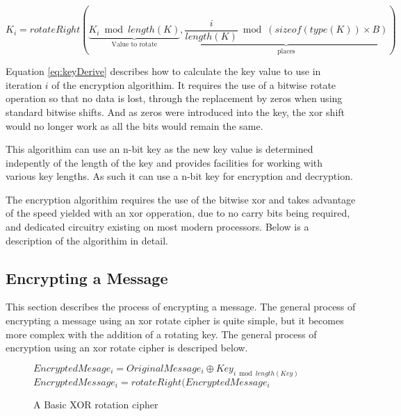 \documentclass[12pt]{article}
\begin{document}
  \begin{equation}
    \label{eq:keyDerive}
    K_i = rotateRight(
        \underbrace{K_i \bmod length(K)}_\text{Value to rotate},
        \underbrace{\frac{i}{length(K)} \bmod (sizeof(type(K)) 
            \times B)}_\text{places}) 
  \end{equation}

  Equation \eqref{eq:keyDerive} describes how to calculate the key value to use
  in iteration \( i \) of the encryption algorithim. It requires the use
  of a bitwise rotate operation so that no data is lost, through the
  replacement by zeros when using standard bitwise shifts. And as zeros
  were introduced into the key, the xor shift would no longer work as
  all the bits would remain the same.

  This algorithim can use an n-bit key as the new key value is
  determined indepently of the length of the key and provides
  facilities for working with various key lengths. As such it can use
  a n-bit key for encryption and decryption.

  The encryption algorithim requires the use of the bitwise xor and
  takes advantage of the speed yielded with an xor opperation, due to
  no carry bits being required, and dedicated circuitry existing on most
  modern processors. Below is a description of the algorithim in detail.

  \subsection{Encrypting a Message}
    This section describes the process of encrypting a message.
    The general process of encrypting a message using an xor rotate
    cipher is quite simple, but it becomes more complex with the
    addition of a rotating key. The general process of encryption
    using an xor rotate cipher is descriped below. 
    
    \begin{figure}[h]
    \begin{algorithmic}[1]
      \State $EncryptedMesage_i =
             OriginalMessage_i \oplus Key_{i \bmod length(Key)}$
      \State $EncryptedMessage_i = rotateRight(EncryptedMessage_i$
    \EndFor 
    \end{algorithmic}
    \caption{A Basic XOR rotation cipher}
    \end{figure}
\end{document}
